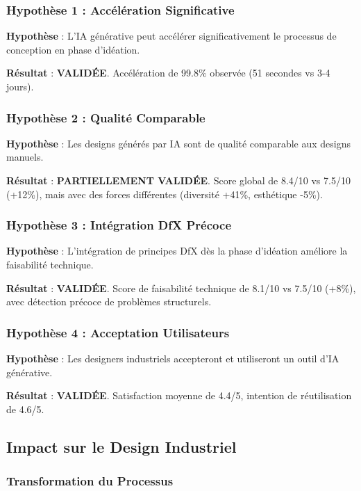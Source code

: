 \subsubsection{Hypothèse 1 : Accélération Significative}

\textbf{Hypothèse} : L'IA générative peut accélérer significativement le processus de conception en phase d'idéation.

\textbf{Résultat} : \textbf{VALIDÉE}. Accélération de 99.8\% observée (51 secondes vs 3-4 jours).

\subsubsection{Hypothèse 2 : Qualité Comparable}

\textbf{Hypothèse} : Les designs générés par IA sont de qualité comparable aux designs manuels.

\textbf{Résultat} : \textbf{PARTIELLEMENT VALIDÉE}. Score global de 8.4/10 vs 7.5/10 (+12\%), mais avec des forces différentes (diversité +41\%, esthétique -5\%).

\subsubsection{Hypothèse 3 : Intégration DfX Précoce}

\textbf{Hypothèse} : L'intégration de principes DfX dès la phase d'idéation améliore la faisabilité technique.

\textbf{Résultat} : \textbf{VALIDÉE}. Score de faisabilité technique de 8.1/10 vs 7.5/10 (+8\%), avec détection précoce de problèmes structurels.

\subsubsection{Hypothèse 4 : Acceptation Utilisateurs}

\textbf{Hypothèse} : Les designers industriels accepteront et utiliseront un outil d'IA générative.

\textbf{Résultat} : \textbf{VALIDÉE}. Satisfaction moyenne de 4.4/5, intention de réutilisation de 4.6/5.

\subsection{Impact sur le Design Industriel}

\subsubsection{Transformation du Processus}

